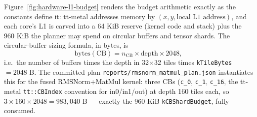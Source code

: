 Figure~\ref{fig:hardware-l1-budget} renders the budget arithmetic exactly as
the constants define it: tt-metal addresses memory by $(x, y, \text{local L1
address})$, and each core's L1 is carved into a 64 KiB reserve (kernel code
and stack) plus the 960 KiB the planner may spend on circular buffers and
tensor shards. The circular-buffer sizing formula, in bytes, is
\begin{equation}
  \text{bytes}(\mathrm{CB}) = n_{\mathrm{CB}} \times \text{depth} \times 2048,
  \label{eq:hardware-cb-sizing}
\end{equation}
i.e.\ the number of buffers times the depth in 32$\times$32 tiles times
\texttt{kTileBytes} $= 2048$ B. The committed plan
\texttt{reports/rmsnorm\_matmul\_plan.json} instantiates this for the fused
RMSNorm+MatMul kernel: three CBs (\texttt{c\_0}, \texttt{c\_1}, \texttt{c\_16},
the tt-metal \texttt{tt::CBIndex} convention for in0/in1/out) at depth 160
tiles each, so $3 \times 160 \times 2048 = 983{,}040$ B --- exactly the
960 KiB \texttt{kCBShardBudget}, fully consumed.

